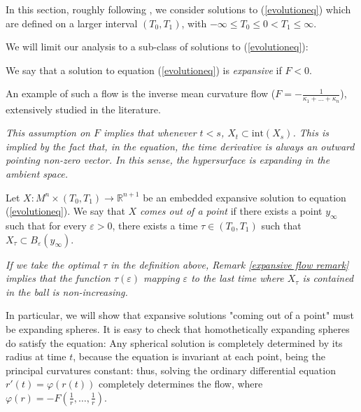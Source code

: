 In this section, roughly following \cite{SinestRisa}, we consider solutions to (\ref{evolutioneq}) which are defined on a larger interval $(T_0, T_1)$, with  $-\infty \leq T_0 \leq 0 < T_1 \leq \infty$. 

We will limit our analysis to a sub-class of solutions to (\ref{evolutioneq}):
\begin{defin}
	We say that a solution to equation (\ref{evolutioneq}) is {\em expansive} if $F<0$. 
\end{defin}
An example of such a flow is the inverse mean curvature flow ($F=-\frac{1}{\kappa_1+\dots + \kappa_n}$), extensively studied in the literature. 
\begin{oss}	
	\em This assumption on $F$ implies that whenever $t<s$, $X_t \subset \mathrm{int}(X_s)$. This is implied by the fact that, in the equation, the time derivative is always an outward pointing non-zero vector.\label{expansive flow remark} In this sense, the hypersurface is expanding in the ambient space.
\end{oss}
\begin{defin}
	Let $ X : M^n \times (T_0, T_1) \to \mathbb{R}^{n+1} $ be an embedded expansive solution to equation (\ref{evolutioneq}). We say that {\em $X$ comes out of a point} if there exists a point $y_\infty$ such that for every $\varepsilon>0$, there exists a time $\tau \in  (T_0, T_1)$ such that $X_\tau \subset B_\varepsilon(y_\infty)$.
\end{defin}

\begin{oss}	
	\em If we take the optimal $\tau$ in the definition above, Remark \ref{expansive flow remark} implies that the function $\tau(\varepsilon)$ mapping $\varepsilon$ to the last time where $X_\tau$ is contained in the ball is non-increasing.
\end{oss} 


In particular, we will show that expansive solutions "coming out of a point" must be expanding spheres.
It is easy to check that homothetically expanding spheres do satisfy the equation: Any spherical solution is completely determined by its radius at time $t$, because the equation is invariant at each point, being the principal curvatures constant: thus, solving the ordinary differential equation $r'(t) = \varphi(r(t))$ completely determines the flow, where $\varphi(r) = -F(\frac{1}{r}, \dots, \frac{1}{r})$.

